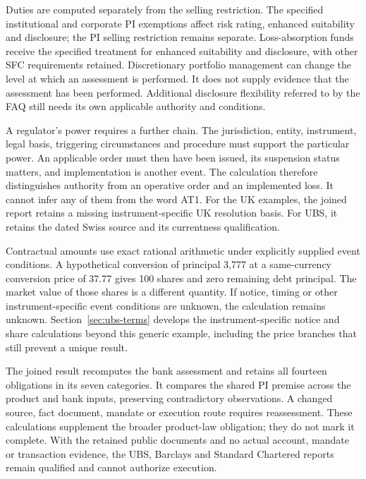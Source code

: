 Duties are computed separately from the selling restriction. The specified
institutional and corporate PI exemptions affect risk rating, enhanced
suitability and disclosure; the PI selling restriction remains separate.
Loss-absorption funds receive the specified treatment for enhanced suitability
and disclosure, with other SFC requirements retained. Discretionary portfolio
management can change the level at which an assessment is performed. It does
not supply evidence that the assessment has been performed. Additional
disclosure flexibility referred to by the FAQ still needs its own applicable
authority and conditions.

A regulator's power requires a further chain. The jurisdiction, entity,
instrument, legal basis, triggering circumstances and procedure must support
the particular power. An applicable order must then have been issued, its
suspension status matters, and implementation is another event. The calculation
therefore distinguishes authority from an operative order and an implemented
loss. It cannot infer any of them from the word AT1. For the UK examples, the
joined report retains a missing instrument-specific UK resolution basis. For
UBS, it retains the dated Swiss source and its currentness qualification.

Contractual amounts use exact rational arithmetic under explicitly supplied
event conditions. A hypothetical conversion of principal 3,777 at a
same-currency conversion price of 37.77 gives 100 shares and zero remaining
debt principal. The market value of those shares is a different quantity.
If notice, timing or other instrument-specific event conditions are unknown,
the calculation remains unknown. Section~\ref{sec:ubs-terms} develops the
instrument-specific notice and share calculations beyond this generic example,
including the price branches that still prevent a unique result.

The joined result recomputes the bank assessment and retains all fourteen
obligations in its seven categories. It compares the shared PI premise across
the product and bank inputs, preserving contradictory observations. A changed
source, fact document, mandate or execution route requires reassessment.
These calculations supplement the broader product-law obligation; they do not
mark it complete. With the retained public documents and no actual account,
mandate or transaction evidence, the UBS, Barclays and Standard Chartered
reports remain qualified and cannot authorize execution.
